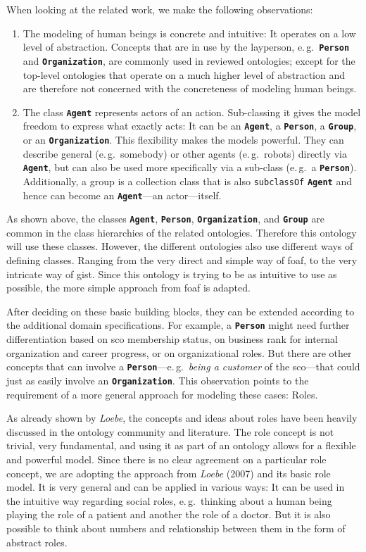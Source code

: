 \documentclass[a4paper, DIV=13, BCOR=0cm]{scrbook}
\newcommand{\eg}{e.\,g.\ }
\newcommand{\class}[1]{\texttt{\textbf{#1}}}
\newcommand{\relation}[1]{\texttt{#1}}
\begin{document}
When looking at the related work, we make the following observations:
\begin{enumerate}
	\item The modeling of human beings is concrete and intuitive: It operates on a low level of abstraction. Concepts that are in use by the layperson, \eg \class{Person} and \class{Organization}, are commonly used in reviewed ontologies; except for the top-level ontologies that operate on a much higher level of abstraction and are therefore not concerned with the concreteness of modeling human beings.
	\item The class \class{Agent} represents actors of an action. Sub-classing it gives the model freedom to express what exactly acts: It can be an \class{Agent}, a \class{Person}, a \class{Group}, or an \class{Organization}. This flexibility makes the models powerful. They can describe general (\eg somebody) or other agents (\eg robots) directly via \class{Agent}, but can also be used more specifically via a sub-class (\eg a \class{Person}). Additionally, a group is a collection class that is also \relation{subclassOf} \class{Agent} and hence can become an \class{Agent}---an actor---itself.
\end{enumerate}

As shown above, the classes \class{Agent}, \class{Person}, \class{Organization}, and \class{Group} are common in the class hierarchies of the related ontologies. Therefore this ontology will use these classes. However, the different ontologies also use different ways of defining classes. Ranging from the very direct and simple way of \gls{foaf}, to the very intricate way of \gls{gist}. Since this ontology is trying to be as intuitive to use as possible, the more simple approach from \gls{foaf} is adapted.

After deciding on these basic building blocks, they can be extended according to the additional domain specifications. For example, a \class{Person} might need further differentiation based on \gls{sco} membership status, on business rank for internal organization and career progress, or on organizational roles. But there are other concepts that can involve a \class{Person}---\eg \textit{being a customer} of the \gls{sco}---that could just as easily involve an \class{Organization}. This observation points to the requirement of a more general approach for modeling these cases: Roles.

As already shown by \textit{Loebe}, the concepts and ideas about roles have been heavily discussed in the ontology community and literature. \cite[p.\,130~1.2]{loebe2007abstract} The role concept is not trivial, very fundamental, and using it as part of an ontology allows for a flexible and powerful model. Since there is no clear agreement on a particular role concept, we are adopting the approach from \textit{Loebe} (2007) and its basic role model. It is very general and can be applied in various ways: It can be used in the intuitive way regarding social roles, \eg thinking about a human being playing the role of a patient and another the role of a doctor. But it is also possible to think about numbers and relationship between them in the form of abstract roles. \cite[p.\,131--133]{loebe2007abstract}
\end{document}
